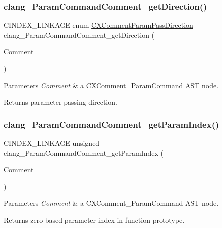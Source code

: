 \subsubsection{\texorpdfstring{clang\+\_\+\+Param\+Command\+Comment\+\_\+get\+Direction()}{clang\_ParamCommandComment\_getDirection()}}
{\footnotesize\ttfamily C\+I\+N\+D\+E\+X\+\_\+\+L\+I\+N\+K\+A\+GE enum \mbox{\hyperlink{group__CINDEX__COMMENT_gafadf6e52217ea74d1a014198df656ee1}{C\+X\+Comment\+Param\+Pass\+Direction}} clang\+\_\+\+Param\+Command\+Comment\+\_\+get\+Direction (\begin{DoxyParamCaption}\item[{\mbox{\hyperlink{structCXComment}{C\+X\+Comment}}}]{Comment }\end{DoxyParamCaption})}


\begin{DoxyParams}{Parameters}
{\em Comment} & a {\ttfamily C\+X\+Comment\+\_\+\+Param\+Command} A\+ST node.\\
\hline
\end{DoxyParams}
\begin{DoxyReturn}{Returns}
parameter passing direction. 
\end{DoxyReturn}
\mbox{\label{group__CINDEX__COMMENT_gad9d1dc9ebb52dcc9cb7da8ca4c23332a}} 
\subsubsection{\texorpdfstring{clang\+\_\+\+Param\+Command\+Comment\+\_\+get\+Param\+Index()}{clang\_ParamCommandComment\_getParamIndex()}}
{\footnotesize\ttfamily C\+I\+N\+D\+E\+X\+\_\+\+L\+I\+N\+K\+A\+GE unsigned clang\+\_\+\+Param\+Command\+Comment\+\_\+get\+Param\+Index (\begin{DoxyParamCaption}\item[{\mbox{\hyperlink{structCXComment}{C\+X\+Comment}}}]{Comment }\end{DoxyParamCaption})}


\begin{DoxyParams}{Parameters}
{\em Comment} & a {\ttfamily C\+X\+Comment\+\_\+\+Param\+Command} A\+ST node.\\
\hline
\end{DoxyParams}
\begin{DoxyReturn}{Returns}
zero-\/based parameter index in function prototype. 
\end{DoxyReturn}
\mbox{\label{group__CINDEX__COMMENT_gaffd7aaf697c5eb3a3d2b508b5d806763}} 
